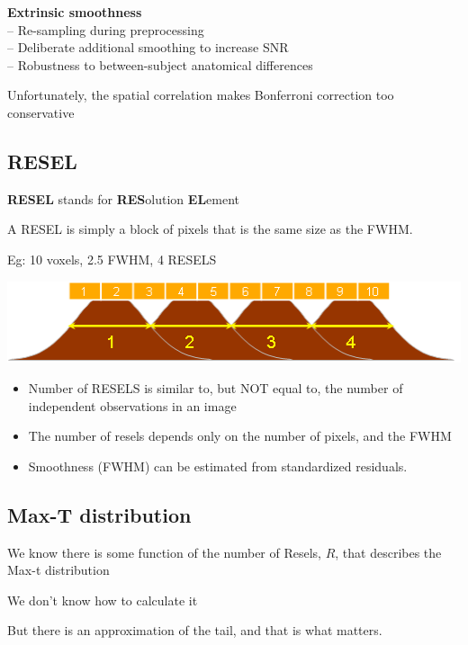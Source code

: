 \documentclass[]{article}
\providecommand{\tightlist}{%
  \setlength{\itemsep}{0pt}\setlength{\parskip}{0pt}}
\begin{document}
\textbf{Extrinsic smoothness}\\
-- Re-sampling during preprocessing\\
-- Deliberate additional smoothing to increase SNR\\
-- Robustness to between-subject anatomical differences

Unfortunately, the spatial correlation makes Bonferroni correction too
conservative

\subsection{RESEL}\label{resel}

\textbf{RESEL} stands for \textbf{RES}olution \textbf{EL}ement

A RESEL is simply a block of pixels that is the same size as the FWHM.

Eg: 10 voxels, 2.5 FWHM, 4 RESELS

\begin{center}\includegraphics[width=600px]{./figs/resel_es} \end{center}

\begin{itemize}
\tightlist
\item
  Number of RESELS is similar to, but NOT equal to, the number of
  independent observations in an image
\item
  The number of resels depends only on the number of pixels, and the
  FWHM
\item
  Smoothness (FWHM) can be estimated from standardized residuals.
\end{itemize}

\subsection{Max-T distribution}\label{max-t-distribution}

We know there is some function of the number of Resels, \(R\), that
describes the Max-t distribution

We don't know how to calculate it

But there is an approximation of the tail, and that is what matters.
\end{document}
